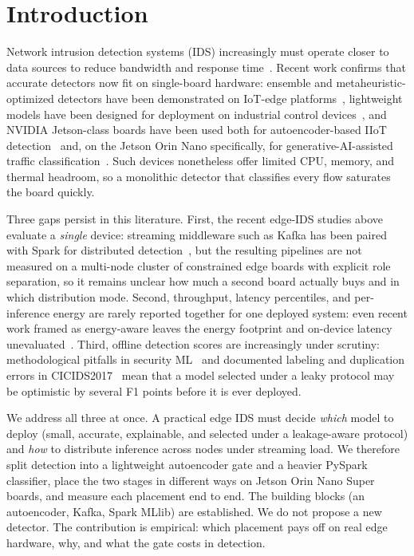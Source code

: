 \documentclass[runningheads]{llncs}
\begin{document}
\section{Introduction}

Network intrusion detection systems (IDS) increasingly must operate closer to data sources to reduce bandwidth and response time~\cite{shi2016edge,hamdan2020edge}. Recent work confirms that accurate detectors now fit on single-board hardware: ensemble and metaheuristic-optimized detectors have been demonstrated on IoT-edge platforms~\cite{baalaji2025ensemble,asghar2026hedid}, lightweight models have been designed for deployment on industrial control devices~\cite{zhang2026edgeics}, and NVIDIA Jetson-class boards have been used both for autoencoder-based IIoT detection~\cite{hasan2025iiot} and, on the Jetson Orin Nano specifically, for generative-AI-assisted traffic classification~\cite{diazgorrin2026jetson}. Such devices nonetheless offer limited CPU, memory, and thermal headroom, so a monolithic detector that classifies every flow saturates the board quickly.

Three gaps persist in this literature. First, the recent edge-IDS studies above evaluate a \emph{single} device: streaming middleware such as Kafka has been paired with Spark for distributed detection~\cite{kumar2025kafkaspark}, but the resulting pipelines are not measured on a multi-node cluster of constrained edge boards with explicit role separation, so it remains unclear how much a second board actually buys and in which distribution mode. Second, throughput, latency percentiles, and per-inference energy are rarely reported together for one deployed system: even recent work framed as energy-aware leaves the energy footprint and on-device latency unevaluated~\cite{nassef2026tinyml}. Third, offline detection scores are increasingly under scrutiny: methodological pitfalls in security ML~\cite{arp2022dosdonts} and documented labeling and duplication errors in CICIDS2017~\cite{lanvin2023errors} mean that a model selected under a leaky protocol may be optimistic by several F1 points before it is ever deployed.

We address all three at once. A practical edge IDS must decide \emph{which} model to deploy (small, accurate, explainable, and selected under a leakage-aware protocol) and \emph{how} to distribute inference across nodes under streaming load. We therefore split detection into a lightweight autoencoder gate and a heavier PySpark classifier, place the two stages in different ways on Jetson Orin Nano Super boards, and measure each placement end to end. The building blocks (an autoencoder, Kafka, Spark MLlib) are established. We do not propose a new detector. The contribution is empirical: which placement pays off on real edge hardware, why, and what the gate costs in detection.
\end{document}

